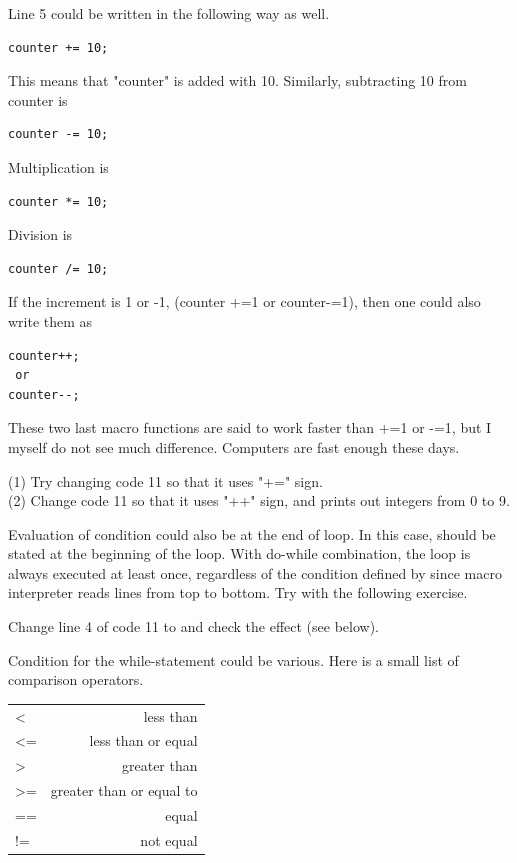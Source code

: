 Line 5 could be written in the following way as well.
\begin{lstlisting}[numbers=none]
counter += 10;
\end{lstlisting}
This means that "counter" is added with 10. Similarly, subtracting 10 from counter is 
\begin{lstlisting}[numbers=none]
counter -= 10;
\end{lstlisting}
Multiplication is 
\begin{lstlisting}[numbers=none]
counter *= 10;
\end{lstlisting}
Division is
\begin{lstlisting}[numbers=none]
counter /= 10;
\end{lstlisting}
If the increment is 1 or -1, (counter +=1 or counter-=1), then one could also write them  as 
\begin{lstlisting}[numbers=none]
counter++;
 or 
counter--;
\end{lstlisting}
These two last macro functions are said to work faster than +=1 or -=1, but I myself do not see much difference. Computers are fast enough these days. 

\begin{indentexercise}{1}
(1) Try changing code 11 so that it uses "+=" sign.\\
(2) Change code 11 so that it uses "++" sign, and prints out integers from 0 to 9.\\
\end{indentexercise}
Evaluation of  condition could also be at the end of loop. In this case,  should be stated at the beginning of the loop. With do-while combination, the loop is always executed at least once, regardless of the condition defined by  since macro interpreter reads lines from top to bottom. Try with the following exercise.

\begin{indentexercise}{2}
Change line 4 of code 11 to  and check the effect (see below).
\end{indentexercise}



Condition for the while-statement could be various. Here is a small list of comparison operators.

\begin{indentCom}
 \begin{tabular*}{0.5\textwidth}{ l r }
< & less than \\
<= & less than or equal\\ 
> & greater than\\ 
>= & greater than or equal to\\
== & equal\\
!= & not equal\\
 \end{tabular*}
\end{indentCom}

